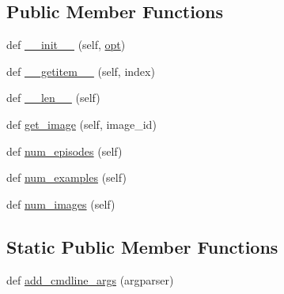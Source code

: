 \subsection*{Public Member Functions}
\begin{DoxyCompactItemize}
\item 
def \hyperlink{classparlai_1_1tasks_1_1image__chat_1_1agents_1_1DefaultDataset_a4459f064418d6dbeb9e00da5ac54c49c}{\+\_\+\+\_\+init\+\_\+\+\_\+} (self, \hyperlink{classparlai_1_1tasks_1_1image__chat_1_1agents_1_1DefaultDataset_a14a912c6b7293b439de09f085fd8e34b}{opt})
\item 
def \hyperlink{classparlai_1_1tasks_1_1image__chat_1_1agents_1_1DefaultDataset_a613fca15fd01c49632e751eebe2fefa9}{\+\_\+\+\_\+getitem\+\_\+\+\_\+} (self, index)
\item 
def \hyperlink{classparlai_1_1tasks_1_1image__chat_1_1agents_1_1DefaultDataset_ae786128b555cabc38b32841f4569ee62}{\+\_\+\+\_\+len\+\_\+\+\_\+} (self)
\item 
def \hyperlink{classparlai_1_1tasks_1_1image__chat_1_1agents_1_1DefaultDataset_ad06939ed5ac1393185d8e4eb1cf1706e}{get\+\_\+image} (self, image\+\_\+id)
\item 
def \hyperlink{classparlai_1_1tasks_1_1image__chat_1_1agents_1_1DefaultDataset_afd35ea4ecd0e16f58eceb52317da429e}{num\+\_\+episodes} (self)
\item 
def \hyperlink{classparlai_1_1tasks_1_1image__chat_1_1agents_1_1DefaultDataset_a50e9a914fa61e0070403b5806a9c392b}{num\+\_\+examples} (self)
\item 
def \hyperlink{classparlai_1_1tasks_1_1image__chat_1_1agents_1_1DefaultDataset_aa926ef2ab5deb252b7ee8b6023c8ae7b}{num\+\_\+images} (self)
\end{DoxyCompactItemize}
\subsection*{Static Public Member Functions}
\begin{DoxyCompactItemize}
\item 
def \hyperlink{classparlai_1_1tasks_1_1image__chat_1_1agents_1_1DefaultDataset_ab2f0a95dcd1207f0a21ce0de5a7b767a}{add\+\_\+cmdline\+\_\+args} (argparser)
\end{DoxyCompactItemize}
